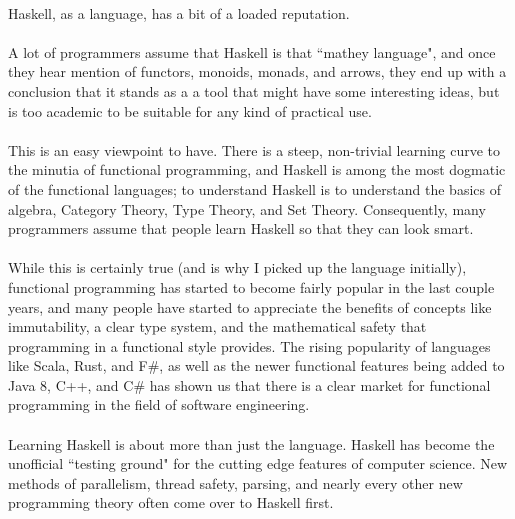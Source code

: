 \begin{foreword}

\paragraph{}
Haskell, as a language, has a bit of a loaded reputation.  

\paragraph{}
A lot of programmers assume that Haskell is that ``mathey language", and once they hear mention of functors, monoids, monads, and arrows, they end up with a conclusion that it stands as a a tool that might have some interesting ideas, but is too academic to be suitable for any kind of practical use. 

\paragraph{}
This is an easy viewpoint to have.  There is a steep, non-trivial learning curve to the minutia of functional programming, and Haskell is among the most dogmatic of the functional languages; to understand Haskell is to understand the basics of algebra, Category Theory, Type Theory, and Set Theory.  Consequently, many programmers assume that people learn Haskell so that they can look smart. 

\paragraph{}
While this is certainly true (and is why I picked up the language initially), functional programming has started to become fairly popular in the last couple years, and many people have started to appreciate the benefits of concepts like immutability, a clear type system, and the mathematical safety that programming in a functional style provides. The rising popularity of languages like Scala, Rust, and F\#, as well as the newer functional features being added to Java 8, C++, and C\# has shown us that there is a clear market for functional programming in the field of software engineering. 

\paragraph{}
Learning Haskell is about more than just the language. Haskell has become the unofficial ``testing ground" for the cutting edge features of computer science. New methods of parallelism, thread safety, parsing, and nearly every other new programming theory often come over to Haskell first. 


\end{foreword}
